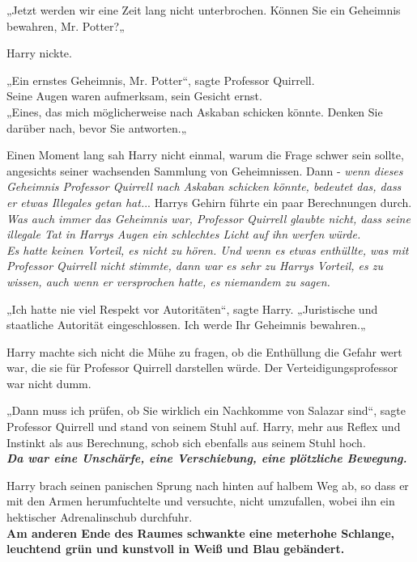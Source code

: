 {„Jetzt werden wir eine Zeit lang nicht unterbrochen. Können Sie ein Geheimnis bewahren, Mr. Potter?„

Harry nickte.

„Ein ernstes Geheimnis, Mr. Potter“, sagte Professor Quirrell.\\ Seine Augen waren aufmerksam, sein Gesicht ernst.\\ „Eines, das mich möglicherweise nach Askaban schicken könnte. Denken Sie darüber nach, bevor Sie antworten.„

Einen Moment lang sah Harry nicht einmal, warum die Frage schwer sein sollte, angesichts seiner wachsenden Sammlung von Geheimnissen. Dann - \emph{wenn dieses Geheimnis Professor Quirrell nach Askaban schicken könnte, bedeutet das, dass er etwas Illegales getan hat.}.. Harrys Gehirn führte ein paar Berechnungen durch.\\ \emph{Was auch immer das Geheimnis war, Professor Quirrell glaubte nicht, dass seine illegale Tat in Harrys Augen ein schlechtes Licht auf ihn werfen würde.\\ Es hatte keinen Vorteil, es nicht zu hören. Und wenn es etwas enthüllte, was mit Professor Quirrell nicht stimmte, dann war es sehr zu Harrys Vorteil, es zu wissen, auch wenn er versprochen hatte, es niemandem zu sagen.}

„Ich hatte nie viel Respekt vor Autoritäten“, sagte Harry. „Juristische und staatliche Autorität eingeschlossen. Ich werde Ihr Geheimnis bewahren.„

Harry machte sich nicht die Mühe zu fragen, ob die Enthüllung die Gefahr wert war, die sie für Professor Quirrell darstellen würde. Der Verteidigungsprofessor war nicht dumm.

„Dann muss ich prüfen, ob Sie wirklich ein Nachkomme von Salazar sind“, sagte Professor Quirrell und stand von seinem Stuhl auf. Harry, mehr aus Reflex und Instinkt als aus Berechnung, schob sich ebenfalls aus seinem Stuhl hoch.\\ \textbf{\emph{Da war eine Unschärfe, eine Verschiebung, eine plötzliche Bewegung.}}

Harry brach seinen panischen Sprung nach hinten auf halbem Weg ab, so dass er mit den Armen herumfuchtelte und versuchte, nicht umzufallen, wobei ihn ein hektischer Adrenalinschub durchfuhr.\\

\hfill\break \textbf{Am anderen Ende des Raumes schwankte eine meterhohe Schlange, leuchtend grün und kunstvoll in Weiß und Blau gebändert.}

}
